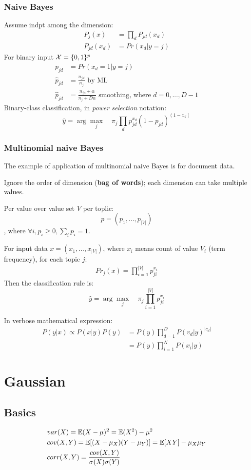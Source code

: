 \documentclass[a4paper]{report}
\begin{document}
\subsubsection{Naive Bayes}
Assume indpt among the dimension:
\begin{align*}
P_j(x) &= \prod_d P_{jd}(x_d) \\
P_{jd}(x_d) &= Pr(x_d|y=j) 
\end{align*}
For binary input $\mathcal{X}=\{0, 1\}^p$
\begin{align*}
p_{jd} &= Pr(x_d=1|y=j)\\
\hat p_{jd} &= \frac{n_{jd}}{n_{j}} \text{ by ML}\\
\hat p_{jd} &= \frac{n_{jd}+\alpha}{n_{j}+D\alpha} \text{ smoothing, where } d= 0,...,D-1
\end{align*}
Binary-class classification, in \textit{power selection} notation:
$$
\hat y = \arg\max_j \quad \pi_j \prod_d p_{jd}^{x_d}(1-p_{jd})^{(1-x_d)}
$$
\subsubsection{Multinomial naive Bayes}
The example of application of multinomial naive Bayes is for document data. 

Ignore the order of dimension (\textbf{bag of words}); each dimension can take multiple values.

Per value over value set $V$ per toplic:
$$
p = (p_1,..., p_{|V|})
$$
, where $\forall i, p_i\geq 0, \sum_i p_i=1$.

For input data $x=(x_1, ..., x_{|V|})$, where $x_i$ means count of value $V_i$ (term frequency), for each topic $j$:
\begin{align*}
Pr_j(x) = \prod_{i=1}^{|V|}p_{ji}^{x_i}
\end{align*}
Then the classification rule is: 
$$
\hat y = \arg \max_j\quad \pi_j \prod_{i=1}^{|V|}p_{ji}^{x_i}
$$

In verbose mathematical expression:
\begin{align*}
P(y|x)\propto P(x|y)P(y)&=P(y)\prod_{d=1}^{D}P(v_d|y)^{|c_d|}\\
&=P(y)\prod_{i=1}^{N}P(x_i|y)
\end{align*}
\section{Gaussian}
\subsection{Basics}
\begin{align*}
& var(X) = \mathbb{E}(X-\mu)^2 = \mathbb{E}(X^2)-\mu^2 \\
& cov(X, Y) = \mathbb{E}[(X-\mu_X)(Y-\mu_Y)] = \mathbb{E}[XY]-\mu_X\mu_Y \\
& corr(X, Y) = \frac{cov(X, Y)}{\sigma(X)\sigma(Y)}
\end{align*}
\end{document}
